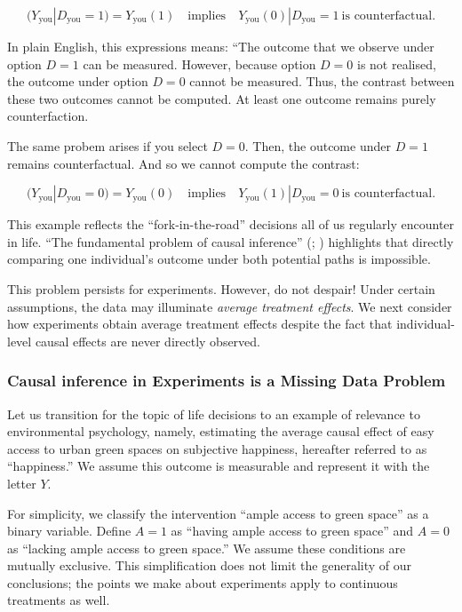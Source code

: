 \documentclass[
  singlecolumn]{article}
\begin{document}
\[
(Y_{\text{you}}|D_{\text{you}} = 1) = Y_{\text{you}}(1) \quad \text{implies} \quad Y_{\text{you}}(0)|D_{\text{you}} = 1~ \text{is counterfactual}.
\]

In plain English, this expressions means: ``The outcome that we observe
under option \(D = 1\) can be measured. However, because option
\(D = 0\) is not realised, the outcome under option \(D=0\) cannot be
measured. Thus, the contrast between these two outcomes cannot be
computed. At least one outcome remains purely counterfaction.

The same probem arises if you select \(D = 0\). Then, the outcome under
\(D=1\) remains counterfactual. And so we cannot compute the contrast:

\[
(Y_{\text{you}}|D_{\text{you}} = 0) = Y_{\text{you}}(0) \quad \text{implies} \quad Y_{\text{you}}(1)|D_{\text{you}} = 0~ \text{is counterfactual}.
\]

This example reflects the ``fork-in-the-road'' decisions all of us
regularly encounter in life. ``The fundamental problem of causal
inference'' (;
) highlights that directly comparing
one individual's outcome under both potential paths is impossible.

This problem persists for experiments. However, do not despair! Under
certain assumptions, the data may illuminate \emph{average treatment
effects}. We next consider how experiments obtain average treatment
effects despite the fact that individual-level causal effects are never
directly observed.

\subsubsection{Causal inference in Experiments is a Missing Data
Problem}\label{causal-inference-in-experiments-is-a-missing-data-problem}

Let us transition for the topic of life decisions to an example of
relevance to environmental psychology, namely, estimating the average
causal effect of easy access to urban green spaces on subjective
happiness, hereafter referred to as ``happiness.'' We assume this
outcome is measurable and represent it with the letter \(Y\).

For simplicity, we classify the intervention ``ample access to green
space'' as a binary variable. Define \(A = 1\) as ``having ample access
to green space'' and \(A = 0\) as ``lacking ample access to green
space.'' We assume these conditions are mutually exclusive. This
simplification does not limit the generality of our conclusions; the
points we make about experiments apply to continuous treatments as well.
\end{document}
